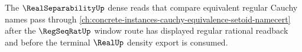 The $\RealSeparabilityUp$ dense reads that compare equivalent regular Cauchy names pass through \autoref{ch:concrete-instances-cauchy-equivalence-setoid-namecert} after the $\RegSeqRatUp$ window route has displayed regular rational readback and before the terminal $\RealUp$ density export is consumed.
